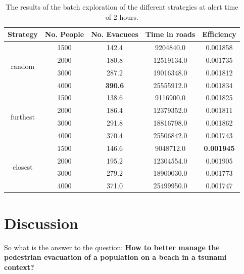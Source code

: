 \documentclass[12pt]{article}
\begin{document}
\begin{table}[h!]
    \centering
    \begin{tabular}{|c|c|c|c|c|}
    \hline
    \textbf{Strategy} & \textbf{No. People} & \textbf{No. Evacuees} & \textbf{Time in roads} & \textbf{Efficiency} \\ \hline
    \multirow{4}{*}{random}   & 1500 & 142.4 & 9204840.0  & 0.001858 \\ \cline{2-5} 
                                & 2000 & 180.8 & 12519134.0 & 0.001735 \\ \cline{2-5} 
                                & 3000 & 287.2 & 19016348.0 & 0.001812 \\ \cline{2-5} 
                                & 4000 & \textbf{390.6} & 25555912.0 & 0.001834 \\ \hline
    \multirow{4}{*}{furthest} & 1500 & 138.6 & 9116900.0  & 0.001825 \\ \cline{2-5} 
                                & 2000 & 186.4 & 12379352.0 & 0.001811 \\ \cline{2-5} 
                                & 3000 & 291.8 & 18816798.0 & 0.001862 \\ \cline{2-5} 
                                & 4000 & 370.4 & 25506842.0 & 0.001743 \\ \hline
    \multirow{4}{*}{closest}  & 1500 & 146.6 & 9048712.0  & \textbf{0.001945} \\ \cline{2-5} 
                                & 2000 & 195.2 & 12304554.0 & 0.001905 \\ \cline{2-5} 
                                & 3000 & 279.2 & 18900030.0 & 0.001773 \\ \cline{2-5} 
                                & 4000 & 371.0 & 25499950.0 & 0.001747 \\ \hline
    \end{tabular}
    \caption{The results of the batch exploration of the different strategies at alert time of 2 hours.}
    \label{tab:batch}
\end{table}

\section{Discussion}

So what is the answer to the question: \textbf{How to better manage the pedestrian evacuation of a population on a beach in a tsunami context?} \\
\end{document}
